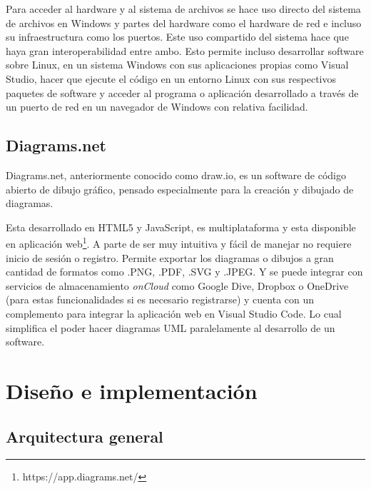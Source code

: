 \documentclass[a4paper, 12pt]{book}
\begin{document}
Para acceder al hardware y al sistema de archivos se hace uso directo del sistema de archivos en Windows y partes del hardware como el hardware de red e incluso su infraestructura como los puertos. Este uso compartido del sistema hace que haya gran interoperabilidad entre ambo. Esto permite incluso desarrollar software sobre Linux, en un sistema Windows con sus aplicaciones propias como Visual Studio, hacer que ejecute el código en un entorno Linux con sus respectivos paquetes de software y acceder al programa o aplicación desarrollado a través de un puerto de red en un navegador de Windows con relativa facilidad. 

\section{Diagrams.net}
Diagrams.net, anteriormente conocido como draw.io, es un software de código abierto de dibujo gráfico, pensado especialmente para la creación y dibujado de diagramas.

Esta desarrollado en HTML5 y JavaScript, es multiplataforma y esta disponible en aplicación web\footnote{https://app.diagrams.net/}. A parte de ser muy intuitiva y fácil de manejar no requiere inicio de sesión o registro. Permite exportar los diagramas o dibujos a gran cantidad de formatos como .PNG, .PDF, .SVG y .JPEG. Y se puede integrar con servicios de almacenamiento \emph{onCloud} como Google Dive, Dropbox o OneDrive (para estas funcionalidades si es necesario registrarse) y cuenta con un complemento para integrar la aplicación web en Visual Studio Code. Lo cual simplifica el poder hacer diagramas UML paralelamente al desarrollo de un software.



\chapter{Diseño e implementación}
\label{chap:diseño}


\section{Arquitectura general} 
\label{sec:arquitectura}
\end{document}
